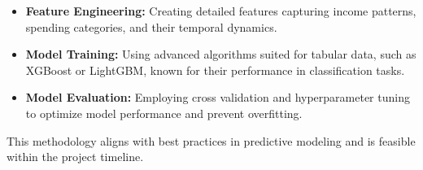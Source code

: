 \documentclass[12pt,letterpaper]{article}
\begin{document}
\begin{itemize}
    \item \textbf{Feature Engineering:} Creating detailed features capturing income patterns, spending categories, and their temporal dynamics.
    \item \textbf{Model Training:} Using advanced algorithms suited for tabular data, such as XGBoost or LightGBM, known for their performance in classification tasks.
    \item \textbf{Model Evaluation:} Employing cross validation and hyperparameter tuning to optimize model performance and prevent overfitting.
\end{itemize}
This methodology aligns with best practices in predictive modeling and is feasible within the project timeline.
\end{document}
